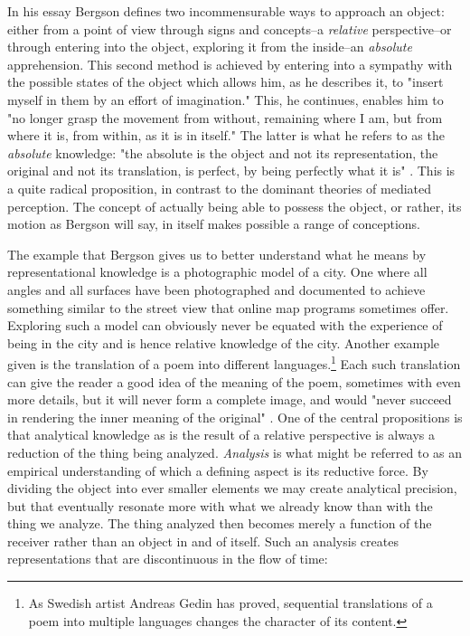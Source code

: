 \documentclass[11pt]{article}
\begin{document}
In his essay  Bergson defines two incommensurable ways to approach an object: either from a point of view through signs and concepts--a \emph{relative} perspective--or through entering into the object, exploring it from the inside--an \emph{absolute} apprehension. This second method is achieved by entering into a sympathy with the possible states of the object which allows him, as he describes it, to "insert myself in them by an effort of imagination." \citep[p. 2]{Bergson1912} This, he continues, enables him to "no longer grasp the movement from without, remaining where I am, but from where it is, from within, as it is in itself." \citep[p. 3]{Bergson1912} The latter is what he refers to as the \emph{absolute} knowledge: "the absolute is the object and not its representation, the original and not its translation, is perfect, by being perfectly what it is" \citep[p. 5-6]{Bergson1912}. This is a quite radical proposition, in contrast to the dominant theories of mediated perception. The concept of actually being able to possess the object, or rather, its motion as Bergson will say, in itself makes possible a range of conceptions.

The example that Bergson gives us to better understand what he means by representational knowledge is a photographic model of a city. One where all angles and all surfaces have been photographed and documented to achieve something similar to the street view that online map programs sometimes offer. Exploring such a model can obviously never be equated with the experience of being in the city and is hence relative knowledge of the city. Another example given is the translation of a poem into different languages.\footnote{As Swedish artist Andreas Gedin has proved, sequential translations of a poem into multiple languages changes the character of its content.} Each such translation can give the reader a good idea of the meaning of the poem, sometimes with even more details, but it will never form a complete image, and would "never succeed in rendering the inner meaning of the original" \citep[p. 5]{Bergson1912}. One of the central propositions is that analytical knowledge as is the result of a relative perspective is always a reduction of the thing being analyzed. \emph{Analysis} is what might be referred to as an empirical understanding of which a defining aspect is its reductive force. By dividing the object into ever smaller elements we may create analytical precision, but that eventually resonate more with what we already know than with the thing we analyze. The thing analyzed then becomes merely a function of the receiver rather than an object in and of itself. Such an analysis creates representations that are discontinuous in the flow of time:
\end{document}
